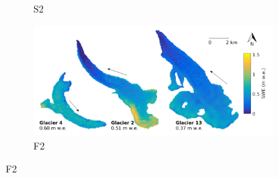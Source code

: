 \documentclass{sfuthesis}
\begin{document}
\begin{figure}[H]
\begin{subfigure}[b]{0.475\textwidth}
            \caption[]%
            {{\small S2}}    
        \end{subfigure}
        \quad
        \begin{subfigure}[b]{0.475\textwidth}   
            \centering 
            \includegraphics[width=\textwidth]{MLRmap_Modelled_Observed4.png}
            \caption[]%
            {{\small F2}}    
        \end{subfigure}
        

\end{figure}
\end{document}
